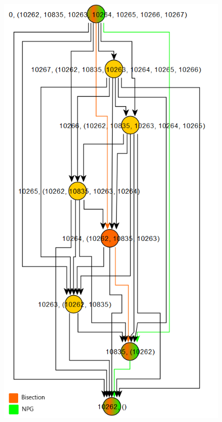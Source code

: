 \documentclass[10pt, aspectratio=169, compress, protectframetitle, handout]{beamer}
\begin{document}
\begin{frame}{}

    \begin{figure}
        \centering
        \includegraphics[scale=0.32]{figures/Policies_Bisection_NPG_3}
    \end{figure}
    
\end{frame}
\end{document}

